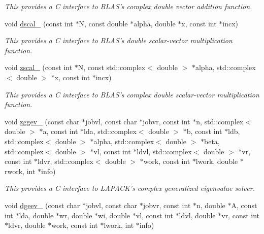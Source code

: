 \begin{DoxyCompactItemize}
\begin{DoxyCompactList}\small\item\em This provides a C interface to B\-L\-A\-S's complex double vector addition function. \end{DoxyCompactList}\item 
\hypertarget{namespacekeycpp_a7d249dd978770119c1b91d88009fefbd}{void \hyperlink{namespacekeycpp_a7d249dd978770119c1b91d88009fefbd}{dscal\-\_\-} (const int $\ast$N, const double $\ast$alpha, double $\ast$x, const int $\ast$incx)}\label{namespacekeycpp_a7d249dd978770119c1b91d88009fefbd}

\begin{DoxyCompactList}\small\item\em This provides a C interface to B\-L\-A\-S's double scalar-\/vector multiplication function. \end{DoxyCompactList}\item 
\hypertarget{namespacekeycpp_ad9dd69d0d355e4805a832813199f1dff}{void \hyperlink{namespacekeycpp_ad9dd69d0d355e4805a832813199f1dff}{zscal\-\_\-} (const int $\ast$N, const std\-::complex$<$ double $>$ $\ast$alpha, std\-::complex$<$ double $>$ $\ast$x, const int $\ast$incx)}\label{namespacekeycpp_ad9dd69d0d355e4805a832813199f1dff}

\begin{DoxyCompactList}\small\item\em This provides a C interface to B\-L\-A\-S's complex double scalar-\/vector multiplication function. \end{DoxyCompactList}\item 
\hypertarget{namespacekeycpp_ace2501951ab3db3a91c3520ae89750b1}{void \hyperlink{namespacekeycpp_ace2501951ab3db3a91c3520ae89750b1}{zggev\-\_\-} (const char $\ast$jobvl, const char $\ast$jobvr, const int $\ast$n, std\-::complex$<$ double $>$ $\ast$a, const int $\ast$lda, std\-::complex$<$ double $>$ $\ast$b, const int $\ast$ldb, std\-::complex$<$ double $>$ $\ast$alpha, std\-::complex$<$ double $>$ $\ast$beta, std\-::complex$<$ double $>$ $\ast$vl, const int $\ast$ldvl, std\-::complex$<$ double $>$ $\ast$vr, const int $\ast$ldvr, std\-::complex$<$ double $>$ $\ast$work, const int $\ast$lwork, double $\ast$rwork, int $\ast$info)}\label{namespacekeycpp_ace2501951ab3db3a91c3520ae89750b1}

\begin{DoxyCompactList}\small\item\em This provides a C interface to L\-A\-P\-A\-C\-K's complex generalized eigenvalue solver. \end{DoxyCompactList}\item 
\hypertarget{namespacekeycpp_aebc5253e80ac15a9bfdc5449ae4f972a}{void \hyperlink{namespacekeycpp_aebc5253e80ac15a9bfdc5449ae4f972a}{dgeev\-\_\-} (const char $\ast$jobvl, const char $\ast$jobvr, const int $\ast$n, double $\ast$A, const int $\ast$lda, double $\ast$wr, double $\ast$wi, double $\ast$vl, const int $\ast$ldvl, double $\ast$vr, const int $\ast$ldvr, double $\ast$work, const int $\ast$lwork, int $\ast$info)}\label{namespacekeycpp_aebc5253e80ac15a9bfdc5449ae4f972a}


\end{DoxyCompactItemize}
